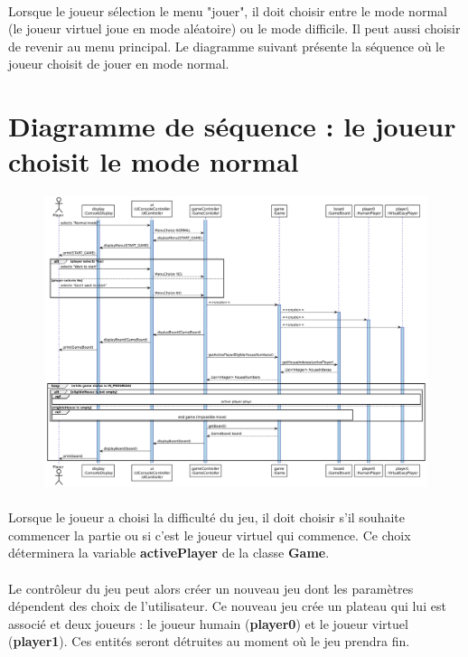 \documentclass{article}
\begin{document}
    \paragraph{}
    Lorsque le joueur sélection le menu "jouer", il doit choisir entre le mode normal (le joueur virtuel joue en mode aléatoire) ou le mode difficile. Il peut aussi choisir de revenir au menu principal. Le diagramme suivant présente la séquence où le joueur choisit de jouer en mode normal.


    \newpage
    \section{Diagramme de séquence : le joueur choisit le mode normal}

    \begin{figure}[H]
        \centering
        \includegraphics[width=\linewidth]{./schemas/sequence3-player-selects-normal.png}
    \end{figure}

    \paragraph{}
    Lorsque le joueur a choisi la difficulté du jeu, il doit choisir s'il souhaite commencer la partie ou si c'est le joueur virtuel qui commence. Ce choix déterminera la variable \textbf{activePlayer} de la classe \textbf{Game}.

    \paragraph{}
    Le contrôleur du jeu peut alors créer un nouveau jeu dont les paramètres dépendent des choix de l'utilisateur. Ce nouveau jeu crée un plateau qui lui est associé et deux joueurs : le joueur humain (\textbf{player0}) et le joueur virtuel (\textbf{player1}). Ces entités seront détruites au moment où le jeu prendra fin.
\end{document}
